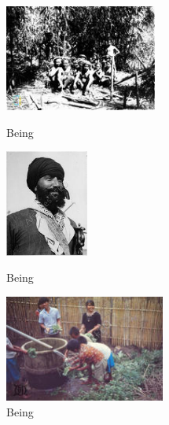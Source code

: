 \documentclass[hidelinks,12pt,a4paper]{report}
\begin{document}
\begin{figure}[!htb]
  \includegraphics[height=3.5cm, left]{images/sample/being_6}
  \captionsetup{labelformat=empty}
  \caption{Being}
\endminipage\hfill
{}
  \includegraphics[height=3.5cm, center]{images/sample/being_35}
  \captionsetup{labelformat=empty}
  \caption{Being}
\endminipage\hfill
{}%
  \includegraphics[height=3.5cm, right]{images/sample/being_45}
  \captionsetup{labelformat=empty}
  \caption{Being}
\endminipage
\end{figure}
\end{document}
